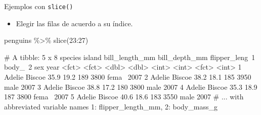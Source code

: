 \documentclass[
  ignorenonframetext,
  aspectratio=169]{beamer}
\newenvironment{Shaded}{\begin{snugshade}}{\end{snugshade}}
\newcommand{\DecValTok}[1]{\textcolor[rgb]{0.00,0.00,0.81}{#1}}
\newcommand{\FunctionTok}[1]{\textcolor[rgb]{0.00,0.00,0.00}{#1}}
\newcommand{\NormalTok}[1]{#1}
\newcommand{\SpecialCharTok}[1]{\textcolor[rgb]{0.00,0.00,0.00}{#1}}
\providecommand{\tightlist}{%
  \setlength{\itemsep}{0pt}\setlength{\parskip}{0pt}}
\let\oldverbatim\verbatim
\let\endoldverbatim\endverbatim
\renewenvironment{verbatim}{\tiny\oldverbatim}{\endoldverbatim}
\begin{document}
\begin{frame}[fragile]{Ejemplos con \texttt{slice()}}
\protect\hypertarget{ejemplos-con-slice}{}
\begin{itemize}
\tightlist
\item
  Elegir las filas de acuerdo a su índice.\\
\end{itemize}

\begin{Shaded}
\begin{Highlighting}[]
\NormalTok{penguins }\SpecialCharTok{\%\textgreater{}\%} 
  \FunctionTok{slice}\NormalTok{(}\DecValTok{23}\SpecialCharTok{:}\DecValTok{27}\NormalTok{)}
\end{Highlighting}
\end{Shaded}

\begin{verbatim}
# A tibble: 5 x 8
  species island bill_length_mm bill_depth_mm flipper_leng~1 body_~2 sex    year
  <fct>   <fct>           <dbl>         <dbl>          <int>   <int> <fct> <int>
1 Adelie  Biscoe           35.9          19.2            189    3800 fema~  2007
2 Adelie  Biscoe           38.2          18.1            185    3950 male   2007
3 Adelie  Biscoe           38.8          17.2            180    3800 male   2007
4 Adelie  Biscoe           35.3          18.9            187    3800 fema~  2007
5 Adelie  Biscoe           40.6          18.6            183    3550 male   2007
# ... with abbreviated variable names 1: flipper_length_mm, 2: body_mass_g
\end{verbatim}
\end{frame}
\end{document}
